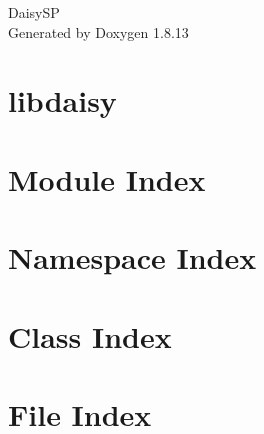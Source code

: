 \documentclass[twoside]{book}
\newcommand{\+}{\discretionary{\mbox{\scriptsize$\hookleftarrow$}}{}{}}
\newcommand{\clearemptydoublepage}{%
  \newpage{\pagestyle{empty}\cleardoublepage}%
}
\begin{document}
\hypersetup{pageanchor=false,
             bookmarksnumbered=true,
             pdfencoding=unicode
            }
\begin{titlepage}
\vspace*{7cm}
\begin{center}%
{\Large Daisy\+SP }\\
\vspace*{1cm}
{\large Generated by Doxygen 1.8.13}\\
\end{center}
\end{titlepage}
\clearemptydoublepage
{}
\tableofcontents
\clearemptydoublepage
{}
\hypersetup{pageanchor=true}

\chapter{libdaisy}
\label{index}\hypertarget{index}{}
\chapter{Module Index}

\chapter{Namespace Index}

\chapter{Class Index}

\chapter{File Index}

\end{document}
